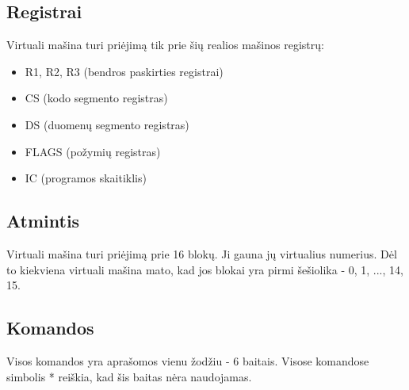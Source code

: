 \documentclass{VUMIFInfKursinis}
\begin{document}
\subsection{Registrai}

Virtuali mašina turi priėjimą tik prie šių realios mašinos registrų:

\begin{itemize}
	\item R1, R2, R3 (bendros paskirties registrai)
	\item CS (kodo segmento registras)
	\item DS (duomenų segmento registras)
	\item FLAGS (požymių registras)
	\item IC (programos skaitiklis)
\end{itemize}

\subsection{Atmintis}

Virtuali mašina turi priėjimą prie 16 blokų. Ji gauna jų virtualius numerius. Dėl to kiekviena virtuali mašina mato, kad jos blokai yra pirmi šešiolika - 0, 1, ..., 14, 15.

\subsection{Komandos}

Visos komandos yra aprašomos vienu žodžiu - 6 baitais. Visose komandose simbolis * reiškia, kad šis baitas nėra naudojamas.
\end{document}
